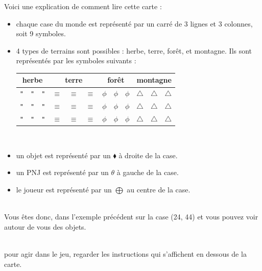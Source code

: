 \documentclass[asi]{picINSA}
\begin{document}
Voici une explication de comment lire cette carte :
\begin{itemize}
\item chaque case du monde est représenté par un carré de 3 lignes et 3 colonnes, soit 9 symboles.
\item 4 types de terrains sont possibles : herbe, terre, forêt, et montagne. Ils sont représentés par les symboles suivants : \\
\begin{tabular}{| c c c | c c c | c c c | c c c | }
 \hline		
  \multicolumn{3}{|c|}{herbe} & \multicolumn{3}{|c|}{terre} & \multicolumn{3}{|c|}{forêt} & \multicolumn{3}{|c|}{montagne} \\	
\hline
    \verb+"+ & \verb+"+ & \verb+"+ & $\equiv$ & $\equiv$ & $\equiv$ & $\phi$ & $\phi$ & $\phi$ & $\triangle$ & $\triangle$ & $\triangle$ \\
    \verb+"+ & \verb+"+ & \verb+"+ & $\equiv$ & $\equiv$ & $\equiv$ & $\phi$ & $\phi$ & $\phi$ & $\triangle$ & $\triangle$ & $\triangle$ \\
    \verb+"+ & \verb+"+ & \verb+"+ & $\equiv$ & $\equiv$ & $\equiv$ & $\phi$ & $\phi$ & $\phi$ & $\triangle$ & $\triangle$ & $\triangle$ \\
 \hline  
 \end{tabular}
~\\
\item un objet est représenté par un $\blacklozenge$ à droite de la case.
\item un PNJ est représenté par un $\theta$ à gauche de la case.
\item le joueur est représenté par un $\bigoplus$ au centre de la case.
\end{itemize}
~\\
Vous êtes donc, dans l'exemple précédent sur la case (24, 44) et vous pouvez voir autour de vous des objets.

~\\ pour agir dans le jeu, regarder les instructions qui s'affichent en dessous de la carte.
\end{document}
